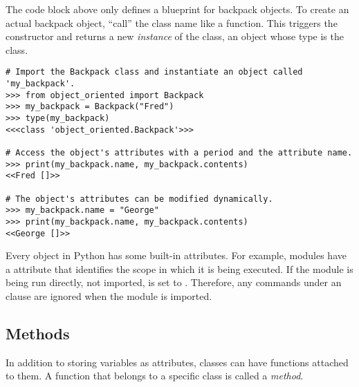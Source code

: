 The  code block above only defines a blueprint for backpack objects.
To create an actual backpack object, ``call'' the class name like a function.
This triggers the constructor and returns a new \emph{instance} of the class, an object whose type is the class.

\begin{lstlisting}
# Import the Backpack class and instantiate an object called 'my_backpack'.
>>> from object_oriented import Backpack
>>> my_backpack = Backpack("Fred")
>>> type(my_backpack)
<<<class 'object_oriented.Backpack'>>>

# Access the object's attributes with a period and the attribute name.
>>> print(my_backpack.name, my_backpack.contents)
<<Fred []>>

# The object's attributes can be modified dynamically.
>>> my_backpack.name = "George"
>>> print(my_backpack.name, my_backpack.contents)
<<George []>>
\end{lstlisting}

\begin{info} %
Every object in Python has some built-in attributes.
For example, modules have a  attribute that identifies the scope in which it is being executed.
If the module is being run directly, not imported,  is set to .
Therefore, any commands under an  clause are ignored when the module is imported.
%
%
\end{info}

\subsection*{Methods} %

In addition to storing variables as attributes, classes can have functions attached to them.
A function that belongs to a specific class is called a \emph{method}.

